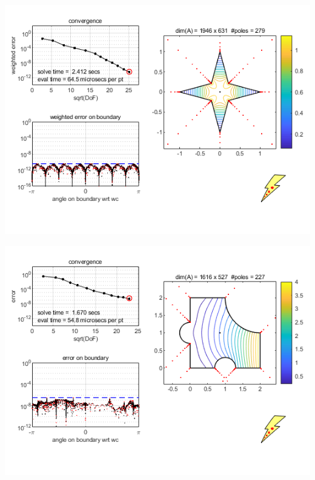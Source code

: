 \documentclass{seminar}
\begin{document}
\begin{slide}
\begin{center}
\includegraphics[scale=0.7]{./PNG/diamond_example}
\end{center}
\end{slide}
\begin{slide}
\begin{center}
\includegraphics[scale=0.7]{./PNG/jigsaw_example}
\end{center}
\end{slide} %
\end{document}
